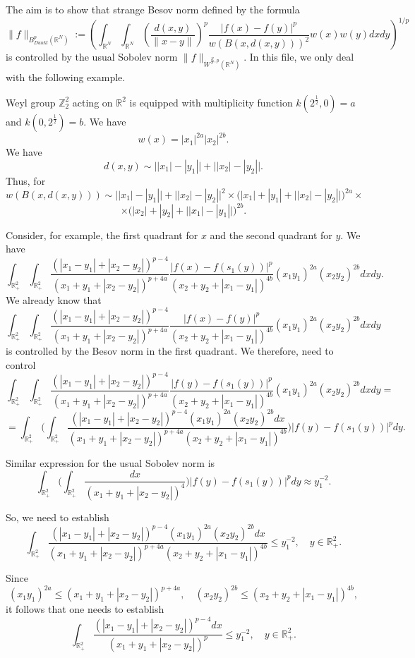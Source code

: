 \documentclass{amsart}
\begin{document}
The aim is to show that strange Besov norm defined by the formula 
$$\|f\|_{B^{p}_{Dunkl}(\mathbb{R}^N)}:=\left(\int_{\mathbb{R}^{N}}\int_{\mathbb{R}^{N}}\left(\frac{d(x,y)}{\|x-y\|}\right)^{p}\frac{|f(x)-f(y)|^p}{w(B(x,d(x,y)))^2}w(x)w(y)dxdy\right)^{1/p}$$
is controlled by the usual Sobolev norm $\|f\|_{\dot{W}^{\frac{N}{p},p}(\mathbb{R}^N)}.$ In this file, we only deal with the following example.

Weyl group $\mathbb{Z}_2^2$ acting on $\mathbb{R}^2$ is equipped with multiplicity function $k(2^{\frac12},0)=a$ and $k(0,2^{\frac12})=b.$ We have
$$w(x)=|x_1|^{2a}|x_2|^{2b}.$$
We have
$$d(x,y)\sim \big||x_1|-|y_1|\big|+\big||x_2|-|y_2|\big|.$$
Thus, for 
$$w(B(x,d(x,y)))\sim \big||x_1|-|y_1|\big|+\big||x_2|-|y_2|\big|^2\times \big(|x_1|+|y_1|+\big||x_2|-|y_2|\big|\big)^{2a}\times$$
$$\times \big(|x_2|+|y_2|+\big||x_1|-|y_1|\big|\big)^{2b}.$$

Consider, for example, the first quadrant for $x$ and the second quadrant for $y.$ We have
$$\int_{\mathbb{R}^2_+}\int_{\mathbb{R}^2_+}\frac{(|x_1-y_1|+|x_2-y_2|)^{p-4}}{(x_1+y_1+|x_2-y_2|)^{p+4a}}\frac{|f(x)-f(s_1(y))|^p}{(x_2+y_2+|x_1-y_1|)^{4b}}(x_1y_1)^{2a}(x_2y_2)^{2b}dxdy.$$
We already know that
$$\int_{\mathbb{R}^2_+}\int_{\mathbb{R}^2_+}\frac{(|x_1-y_1|+|x_2-y_2|)^{p-4}}{(x_1+y_1+|x_2-y_2|)^{p+4a}}\frac{|f(x)-f(y)|^p}{(x_2+y_2+|x_1-y_1|)^{4b}}(x_1y_1)^{2a}(x_2y_2)^{2b}dxdy$$
is controlled by the Besov norm in the first quadrant. We therefore, need to control
$$\int_{\mathbb{R}^2_+}\int_{\mathbb{R}^2_+}\frac{(|x_1-y_1|+|x_2-y_2|)^{p-4}}{(x_1+y_1+|x_2-y_2|)^{p+4a}}\frac{|f(y)-f(s_1(y))|^p}{(x_2+y_2+|x_1-y_1|)^{4b}}(x_1y_1)^{2a}(x_2y_2)^{2b}dxdy=$$
$$=\int_{\mathbb{R}^2_+}\Big(\int_{\mathbb{R}^2_+}\frac{(|x_1-y_1|+|x_2-y_2|)^{p-4}(x_1y_1)^{2a}(x_2y_2)^{2b}dx}{(x_1+y_1+|x_2-y_2|)^{p+4a}(x_2+y_2+|x_1-y_1|)^{4b}}\Big)|f(y)-f(s_1(y))|^pdy.$$

Similar expression for the usual Sobolev norm is
$$\int_{\mathbb{R}^2_+}\Big(\int_{\mathbb{R}^2_+}\frac{dx}{(x_1+y_1+|x_2-y_2|)^4}\Big)|f(y)-f(s_1(y))|^pdy\approx y_1^{-2}.$$

So, we need to establish
$$\int_{\mathbb{R}^2_+}\frac{(|x_1-y_1|+|x_2-y_2|)^{p-4}(x_1y_1)^{2a}(x_2y_2)^{2b}dx}{(x_1+y_1+|x_2-y_2|)^{p+4a}(x_2+y_2+|x_1-y_1|)^{4b}}\leq y_1^{-2},\quad y\in\mathbb{R}^2_+.$$

Since
$$(x_1y_1)^{2a}\leq (x_1+y_1+|x_2-y_2|)^{p+4a},\quad (x_2y_2)^{2b}\leq (x_2+y_2+|x_1-y_1|)^{4b},$$
it follows that one needs to establish
$$\int_{\mathbb{R}^2_+}\frac{(|x_1-y_1|+|x_2-y_2|)^{p-4}dx}{(x_1+y_1+|x_2-y_2|)^p}\leq y_1^{-2},\quad y\in\mathbb{R}^2_+.$$
\end{document}
